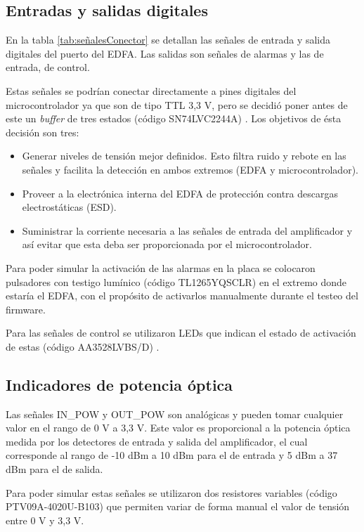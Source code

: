 \subsection{Entradas y salidas digitales}

En la tabla \ref{tab:señalesConector} se detallan las señales de entrada y salida digitales del puerto del EDFA. Las salidas son señales de alarmas y las de entrada, de control.

Estas señales se podrían conectar directamente a pines digitales del microcontrolador ya que son de tipo TTL 3,3 V, pero se decidió poner antes de este un \textit{buffer} de tres estados (código SN74LVC2244A) \citep{WEBSITE:BUFFERS_DS}. Los objetivos de ésta decisión son tres:

\begin{itemize}
\item Generar niveles de tensión mejor definidos. Esto filtra ruido y rebote en las señales y facilita la detección en ambos extremos (EDFA y microcontrolador).
\item Proveer a la electrónica interna del EDFA de protección contra descargas electrostáticas (ESD).
\item Suministrar la corriente necesaria a las señales de entrada del amplificador y así evitar que esta deba ser proporcionada por el microcontrolador.
\end{itemize}

Para poder simular la activación de las alarmas en la placa se colocaron pulsadores con testigo lumínico (código TL1265YQSCLR) \citep{WEBSITE:PULSADOR_DS} en el extremo donde estaría el EDFA, con el propósito de activarlos manualmente durante el testeo del firmware.

Para las señales de control se utilizaron LEDs que indican el estado de activación de estas (código AA3528LVBS/D) \citep{WEBSITE:LEDS_DS}.

\subsection{Indicadores de potencia óptica}

Las señales IN\_POW y OUT\_POW son analógicas y pueden tomar cualquier valor en el rango de 0 V a 3,3 V. Este valor es proporcional a la potencia óptica medida por los detectores de entrada y salida del amplificador, el cual corresponde al rango de -10 dBm a 10 dBm para el de entrada y 5 dBm a 37 dBm para el de salida.

Para poder simular estas señales se utilizaron dos resistores variables (código PTV09A-4020U-B103) \citep{WEBSITE:POTENC_DS} que permiten variar de forma manual el valor de tensión entre 0 V y 3,3 V.

